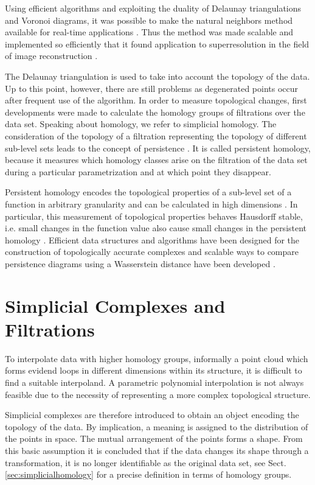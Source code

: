 \documentclass[journal]{IEEEtran}
\begin{document}
Using efficient algorithms and exploiting the duality of Delaunay triangulations and Voronoi diagrams, it was possible to make the natural neighbors method available for real-time applications \cite{LiCL08}. Thus the method was made scalable and implemented so efficiently that it found application to superresolution in the field of image reconstruction \cite{Rodriguez-Dagnino15}.

The Delaunay triangulation is used to take into account the topology of the data. Up to this point, however, there are still problems as degenerated points occur after frequent use of the algorithm. In order to measure topological changes, first developments were made to calculate the homology groups of filtrations over the data set. Speaking about homology, we refer to simplicial homology.
The consideration of the topology of a filtration representing the topology of different sub-level sets leads to the concept of persistence \cite{EdelsbrunnerLZ02}. It is called persistent homology, because it measures which homology classes arise on the filtration of the data set during a particular parametrization and at which point they disappear.

Persistent homology encodes the topological properties of a sub-level set of a function in arbitrary granularity and can be calculated in high dimensions \cite{ZomorodianC05, CarlssonZ09, CarlssonSZ10}. In particular, this measurement of topological properties behaves Hausdorff stable, i.e. small changes in the function value also cause small changes in the persistent homology \cite{CerriL16}. Efficient data structures and algorithms have been designed for the construction of topologically accurate complexes \cite{Zomorodian10} and scalable ways to compare persistence diagrams using a Wasserstein distance have been developed \cite{CarriereCO17}.

\section{Simplicial Complexes and Filtrations}
\label{sec:simplex}
To interpolate data with higher homology groups, informally a point cloud which forms evidend loops in different dimensions within its structure, it is difficult to find a suitable interpoland. A parametric polynomial interpolation is not always feasible due to the necessity of representing a more complex topological structure.

Simplicial complexes are therefore introduced to obtain an object encoding the topology of the data. By implication, a meaning is assigned to the distribution of the points in space. The mutual arrangement of the points forms a shape. From this basic assumption it is concluded that if the data changes its shape through a transformation, it is no longer identifiable as the original data set, see Sect. \ref{sec:simplicialhomology} for a precise definition in terms of homology groups.
\end{document}
